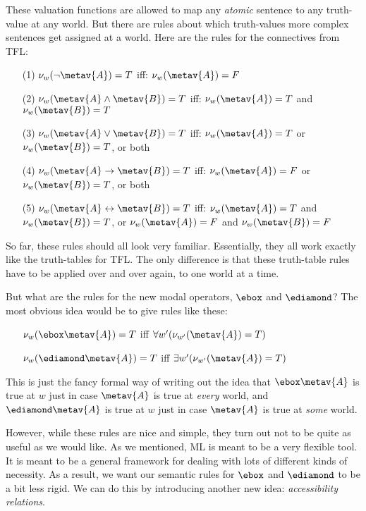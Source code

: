 These valuation functions are allowed to map any \emph{atomic} sentence to any truth-value at any world. But there are rules about which truth-values more complex sentences get assigned at a world. Here are the rules for the connectives from TFL:
\begin{itemize}
	\item[(1)]$\nu_w(\enot\metav{A})=T$ iff: $\nu_w(\metav{A})=F$
	\item[(2)]$\nu_w(\metav{A}\eand\metav{B})=T$ iff: $\nu_w(\metav{A})=T$ and $\nu_w(\metav{B})=T$
	\item[(3)]$\nu_w(\metav{A}\eor\metav{B})=T$ iff: $\nu_w(\metav{A})=T$ or $\nu_w(\metav{B})=T$, or both
	\item[(4)]$\nu_w(\metav{A}\eif\metav{B})=T$ iff: $\nu_w(\metav{A})=F$ or $\nu_w(\metav{B})=T$, or both
	\item[(5)]$\nu_w(\metav{A}\eiff\metav{B})=T$ iff: $\nu_w(\metav{A})=T$ and $\nu_w(\metav{B})=T$, or $\nu_w(\metav{A})=F$ and $\nu_w(\metav{B})=F$
\end{itemize}
So far, these rules should all look very familiar. Essentially, they all work exactly like the truth-tables for TFL. The only difference is that these truth-table rules have to be applied over and over again, to one world at a time.

But what are the rules for the new modal operators, $\ebox$ and $\ediamond$? The most obvious idea would be to give rules like these:
\begin{itemize}
	\item[]$\nu_w(\ebox \metav{A})=T$ iff $\forall w' (\nu_{w'}(\metav{A})=T)$
	\item[]$\nu_w(\ediamond \metav{A})=T$ iff $\exists w' (\nu_{w'}(\metav{A})=T)$
\end{itemize}
This is just the fancy formal way of writing out the idea that $\ebox\metav{A}$ is true at $w$ just in case $\metav{A}$ is true at \emph{every} world, and $\ediamond\metav{A}$ is true at $w$ just in case $\metav{A}$ is true at \emph{some} world.

However, while these rules are nice and simple, they turn out not to be quite as useful as we would like. As we mentioned, ML is meant to be a very flexible tool. It is meant to be a general framework for dealing with lots of different kinds of necessity. As a result, we want our semantic rules for $\ebox$ and $\ediamond$ to be a bit less rigid. We can do this by introducing another new idea: \emph{accessibility relations}.

